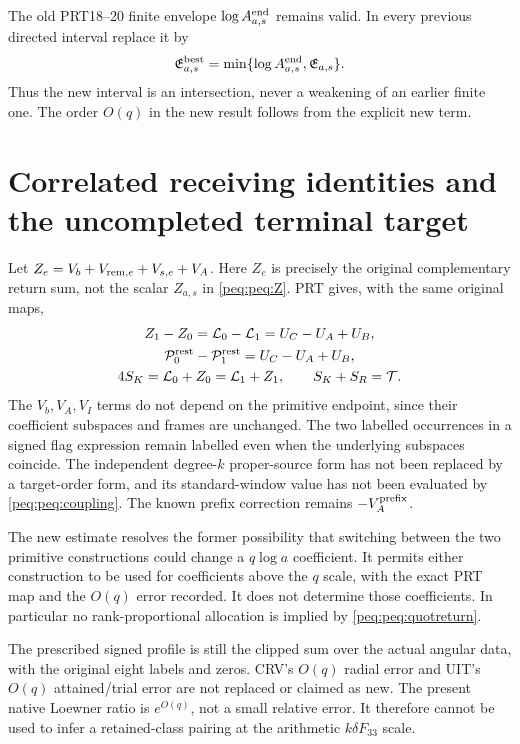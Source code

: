 The old PRT18--20 finite envelope $\log A^{\rm end}_{a,s}$ remains valid. In every previous directed interval replace it by
\begin{equation}
 \mathfrak E^{\rm best}_{a,s}
 =\min\{\log A^{\rm end}_{a,s},\mathfrak E_{a,s}\}.
 \label{peq:peq:intersection}
\end{equation}
Thus the new interval is an intersection, never a weakening of an earlier finite one. The order $O(q)$ in the new result follows from the explicit new term.

\section{Correlated receiving identities and the uncompleted terminal target}
Let $Z_e=V_b+V_{{\rm rem},e}+V_{s,e}+V_A$. Here $Z_e$ is precisely the original complementary return sum, not the scalar $Z_{a,s}$ in \eqref{peq:peq:Z}. PRT gives, with the same original maps,
\begin{equation}
\begin{gathered}
 Z_1-Z_0=\mathcal L_0-\mathcal L_1=U_C-U_A+U_B,\\
 \mathcal P^{\rm rest}_0-\mathcal P^{\rm rest}_1=U_C-U_A+U_B,\\
 4S_K=\mathcal L_0+Z_0=\mathcal L_1+Z_1,\qquad
 S_K+S_R=\mathcal T.
\end{gathered}\label{peq:peq:coupling}
\end{equation}
The $V_b,V_A,V_I$ terms do not depend on the primitive endpoint, since their coefficient subspaces and frames are unchanged. The two labelled occurrences in a signed flag expression remain labelled even when the underlying subspaces coincide. The independent degree-$k$ proper-source form has not been replaced by a target-order form, and its standard-window value has not been evaluated by \eqref{peq:peq:coupling}. The known prefix correction remains $-V_A^{\rm prefix}$.

The new estimate resolves the former possibility that switching between the two primitive constructions could change a $q\log a$ coefficient. It permits either construction to be used for coefficients above the $q$ scale, with the exact PRT map and the $O(q)$ error recorded. It does not determine those coefficients. In particular no rank-proportional allocation is implied by \eqref{peq:peq:quotreturn}.

The prescribed signed profile is still the clipped sum over the actual angular data, with the original eight labels and zeros. CRV's $O(q)$ radial error and UIT's $O(q)$ attained/trial error are not replaced or claimed as new. The present native Loewner ratio is $e^{O(q)}$, not a small relative error. It therefore cannot be used to infer a retained-class pairing at the arithmetic $k\delta F_{33}$ scale.

